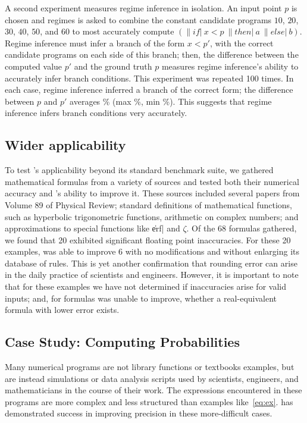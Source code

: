 \documentclass[paper.tex]{subfiles}
\begin{document}
A second experiment measures regime inference in isolation.  An input
point $p$ is chosen and regimes is asked to combine the constant
candidate programs $10$, $20$, $30$, $40$, $50$, and $60$ to most
accurately compute $(\|if|\:x < p\:\|then|\:a\:\|else|\:b)$.
 Regime inference must
infer a branch of the form $x < p'$, with the correct candidate
programs on each side of this branch; then, the difference between the
computed value $p'$ and the ground truth $p$ measures regime
inference's ability to accurately infer branch conditions.  This
experiment was repeated 100 times.  In each case, regime inference
inferred a branch of the correct form; the difference between $p$ and
$p'$ averages \% (max \%, min \%).  This
suggests that regime inference infers branch conditions very
accurately.

\subsection{Wider applicability}

To test \casio's applicability beyond its standard benchmark suite, we
gathered mathematical formulas from a variety of sources and tested
both their numerical accuracy and \casio's ability to improve it.
These sources included several papers from Volume 89 of Physical
Review; standard definitions of mathematical functions, such as
hyperbolic trigonometric functions, arithmetic on complex numbers; and
approximations to special functions like \|erf| and $\zeta$.  Of the
68 formulas gathered, we found that 20 exhibited significant floating
point inaccuracies.  For these 20 examples, \casio was able to improve
6 with no modifications and without enlarging its database of rules.
This is yet another confirmation that rounding error can arise in the
daily practice of scientists and engineers.  However, it is important
to note that for these examples we have not determined if inaccuracies
arise for valid inputs; and, for formulas \casio was unable to
improve, whether a real-equivalent formula with lower error exists.

\subsection{Case Study: Computing Probabilities}

Many numerical programs are not library functions or textbooks
examples, but are instead simulations or data analysis scripts used by
scientists, engineers, and mathematicians in the course of their work.
The expressions encountered in these programs are more complex and
less structured than examples like~\eqref{eq:ex}.  \casio has
demonstrated success in improving precision in these more-difficult
cases.
\end{document}
